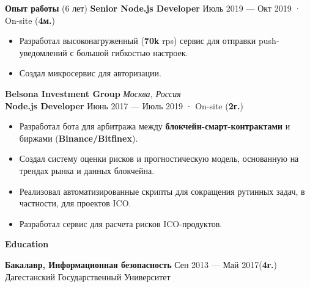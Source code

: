 \documentclass{resume}
\begin{document}
\begin{rSection}{\textbf{Опыт работы} (6 лет) }
    \textbf{Senior Node.js Developer} \hfill Июль 2019 --- Окт 2019 · On-site ({\textbf{4м.}})
    \begin{itemize}
        \item Разработал высоконагруженный (\textbf{70k} rps) сервис для отправки push-уведомлений с большой гибкостью настроек\@.
        \item Создал микросервис для авторизации\@.
    \end{itemize}

    \textbf{Belsona Investment Group} \hfill \textit{Москва, Россия} \\
    \textbf{Node.js Developer}  \hfill Июнь 2017 --- Июль 2019 · On-site ({\textbf{2г.}})
    \begin{itemize}
        \item Разработал бота для арбитража между \textbf{блокчейн-смарт-контрактами} и биржами (\textbf{Binance/Bitfinex})\@.
        \item Создал систему оценки рисков и прогностическую модель, основанную на трендах рынка и данных блокчейна\@.
        \item Реализовал автоматизированные скрипты для сокращения рутинных задач, в частности, для проектов ICO\@.
        \item Разработал сервис для расчета рисков ICO-продуктов\@.
    \end{itemize}

\end{rSection}


\begin{rSection}{\textbf{Education}}

    \textbf{Бакалавр, Информационная безопасность } \hfill {Сен 2013 --- Май 2017({\textbf{4г.}})} \\
    Дагестанский Государственный Университет

\end{rSection}
\end{document}
